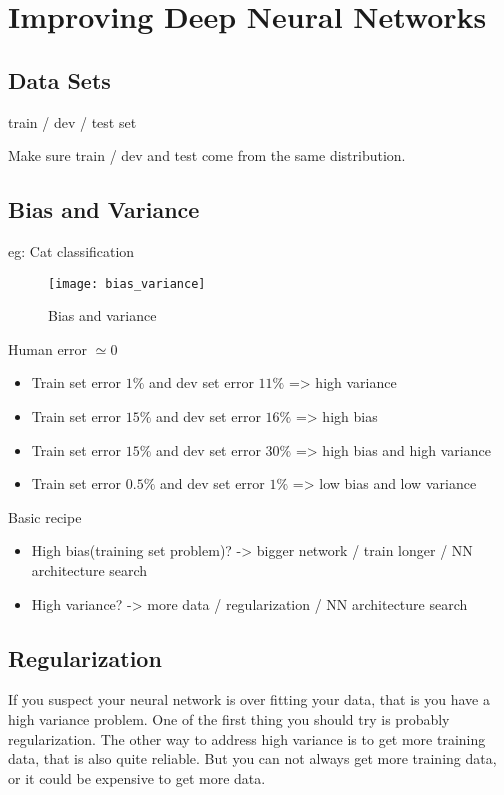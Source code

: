 \section{Improving Deep Neural Networks}

\subsection{Data Sets}
train / dev / test set

Make sure train / dev and test come from the same distribution.

\subsection{Bias and Variance}
eg: Cat classification

\begin{figure}[htbp]
	\centering
	\texttt{[image: bias\_variance]}\\
	\caption{Bias and variance}\label{fig.bias_variance}
\end{figure}

Human error $\simeq 0$
\begin{itemize}
\item Train set error $1\%$ and dev set error $11\%$ => high variance
\item Train set error $15\%$ and dev set error $16\%$ => high bias
\item Train set error $15\%$ and dev set error $30\%$ => high bias and high variance
\item Train set error $0.5\%$ and dev set error $1\%$ => low bias and low variance
\end{itemize}

Basic recipe
\begin{itemize}
\item High bias(training set problem)? -> bigger network / train longer / NN architecture search
\item High variance? -> more data / regularization / NN architecture search
\end{itemize}

\subsection{Regularization}
If you suspect your neural network is over fitting your data, that is you have a high variance problem.
One of the first thing you should try is probably regularization.
The other way to address high variance is to get more training data, that is also quite reliable.
But you can not always get more training data, or it could be expensive to get more data.

